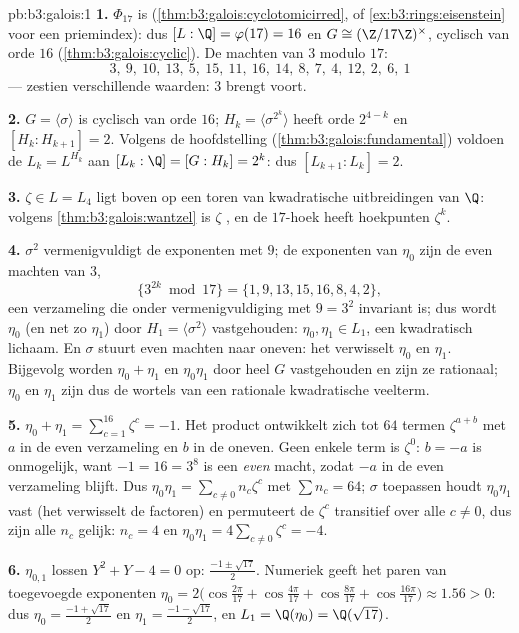 \begin{solution}{pb:b3:galois:1}
\textbf{1.} $\Phi_{17}$ is 
(\cref{thm:b3:galois:cyclotomicirred}, of
\cref{ex:b3:rings:eisenstein} voor een priemindex): dus $[L:\Q] =
\varphi(17) = 16$ en $G \cong (\Z/17\Z)^\times$, cyclisch van orde
$16$ (\cref{thm:b3:galois:cyclic}). De machten van $3$ modulo
$17$:
\[
3,\ 9,\ 10,\ 13,\ 5,\ 15,\ 11,\ 16,\ 14,\ 8,\ 7,\ 4,\ 12,\ 2,\
6,\ 1
\]
--- zestien verschillende waarden: $3$ brengt voort.

\textbf{2.} $G = \langle\sigma\rangle$ is cyclisch van orde $16$;
$H_k = \langle\sigma^{2^k}\rangle$ heeft orde $2^{4-k}$ en $[H_k :
H_{k+1}] = 2$. Volgens de hoofdstelling
(\cref{thm:b3:galois:fundamental}) voldoen de $L_k = L^{H_k}$ aan
$[L_k : \Q] = [G : H_k] = 2^k$: dus $[L_{k+1}:L_k] = 2$.

\textbf{3.} $\zeta \in L = L_4$ ligt boven op een toren van
kwadratische uitbreidingen van $\Q$: volgens
\cref{thm:b3:galois:wantzel} is $\zeta$ , en de
$17$-hoek heeft hoekpunten $\zeta^k$.

\textbf{4.} $\sigma^2$ vermenigvuldigt de exponenten met $9$; de
exponenten van $\eta_0$ zijn de even machten van $3$,
\[
\{3^{2k} \bmod 17\} = \{1, 9, 13, 15, 16, 8, 4, 2\},
\]
een verzameling die onder vermenigvuldiging met $9 = 3^2$
invariant is; dus wordt $\eta_0$ (en net zo $\eta_1$) door $H_1 =
\langle\sigma^2\rangle$ vastgehouden: $\eta_0, \eta_1 \in L_1$,
een kwadratisch lichaam. En $\sigma$ stuurt even machten naar
oneven: het verwisselt $\eta_0$ en $\eta_1$. Bijgevolg worden
$\eta_0 + \eta_1$ en $\eta_0\eta_1$ door heel $G$ vastgehouden en
zijn ze rationaal; $\eta_0$ en $\eta_1$ zijn dus de wortels van
een rationale kwadratische veelterm.

\textbf{5.} $\eta_0 + \eta_1 = \sum_{c=1}^{16}\zeta^c = -1$. Het
product ontwikkelt zich tot $64$ termen $\zeta^{a + b}$ met $a$ in
de even verzameling en $b$ in de oneven. Geen enkele term is
$\zeta^0$: $b = -a$ is onmogelijk, want $-1 = 16 = 3^8$ is een
\emph{even} macht, zodat $-a$ in de even verzameling blijft. Dus
$\eta_0\eta_1 = \sum_{c \neq 0} n_c\zeta^c$ met $\sum n_c = 64$;
$\sigma$ toepassen houdt $\eta_0\eta_1$ vast (het verwisselt de
factoren) en permuteert de $\zeta^c$ transitief over alle $c \neq
0$, dus zijn alle $n_c$ gelijk: $n_c = 4$ en $\eta_0\eta_1 =
4\sum_{c\neq0}\zeta^c = -4$.

\textbf{6.} $\eta_{0,1}$ lossen $Y^2 + Y - 4 = 0$ op: $\frac{-1
\pm \sqrt{17}}2$. Numeriek geeft het paren van toegevoegde
exponenten $\eta_0 = 2\bigl(\cos\tfrac{2\pi}{17} +
\cos\tfrac{4\pi}{17} + \cos\tfrac{8\pi}{17} +
\cos\tfrac{16\pi}{17}\bigr) \approx 1.56 > 0$: dus $\eta_0 =
\frac{-1+\sqrt{17}}2$ en $\eta_1 = \frac{-1-\sqrt{17}}2$, en $L_1
= \Q(\eta_0) = \Q(\sqrt{17})$.


\end{solution}
